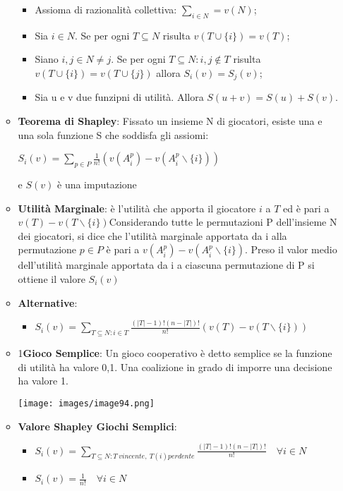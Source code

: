 \documentclass{article}
\theoremstyle{definition}
\theoremstyle{remark}
\begin{document}
\begin{itemize}
\begin{itemize}
\begin{itemize}
            \item Assioma di razionalità collettiva: $\sum_{i\in N}=v(N)$;
            \item Sia $i\in N$. Se per ogni $T\subseteq N$ risulta $v(T\cup \{i\})=v(T)$;
            \item Siano $i,j\in N\neq j$. Se per ogni $T\subseteq N:i,j\not\in T$ risulta $v(T\cup\{i\})=v(T\cup\{j\})$ allora $S_i(v)=S_j(v)$;
            \item Sia u e v due funzipni di utilità. Allora $S(u+v)=S(u)+S(v)$.
        \end{itemize}
        \item \textbf{Teorema di Shapley}: Fissato un insieme N di giocatori, esiste una e una sola funzione S che soddisfa gli assiomi:\begin{center}
            $S_i(v)=\sum_{p\in P} \frac{1}{n!}(v(A_i^p)-v(A_i^p\backslash\{i\}))$
        \end{center}
        e $S(v)$ è una imputazione
        \item \textbf{Utilità Marginale}: è l'utilità che apporta il giocatore $i$ a $T$ ed è pari a $v(T)-v(T\backslash\{i\})$\newline Considerando tutte le permutazioni P dell'insieme N dei giocatori, si dice che l'utilità marginale apportata da i alla permutazione $p\in P$ è pari a $v(A_i^p)-v(A_i^p\backslash\{i\})$. Preso il valor medio dell'utilità marginale apportata da i a ciascuna permutazione di P si ottiene il valore $S_i(v)$
        \item \textbf{Alternative}:\begin{itemize}
            \item $S_i(v)=\sum_{T\subseteq N:i\in T}\frac{(|T|-1)!(n-|T|)!}{n!}(v(T)-v(T\backslash\{i\}))$
        \end{itemize}
        \item 1\textbf{Gioco Semplice}: Un gioco cooperativo è detto semplice se la funzione di utilità ha valore 0,1. Una coalizione in grado di imporre una decisione ha valore 1.\begin{center}
            \texttt{[image: images/image94.png]}
        \end{center}
        \item\textbf{Valore Shapley Giochi Semplici}:\begin{itemize}
            \item $S_i(v)=\sum_{T\subseteq N: T\ vincente,\ T(i) perdente}\frac{(|T|-1)!(n-|T|)!}{n!}\quad\forall i\in N$
            \item $S_i(v)=\frac{1}{n!}\quad \forall i\in N$

\end{itemize}
\end{itemize}
\end{itemize}
\end{document}
